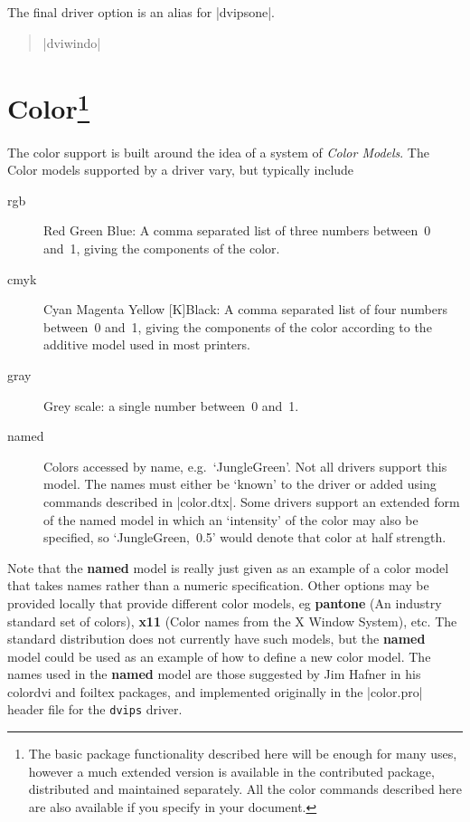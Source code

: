 The final driver option is an alias for |dvipsone|.
\begin{quote}\raggedright
  |dviwindo|
\end{quote}


\section[Color]{Color\footnote{%
The basic  package functionality described here
will be enough for many uses, however a much extended version
is available in the contributed  package, distributed
and maintained separately. All the color commands described here are
also available if you specify  in your document.}%
}
The color support is built around the idea of a system of
\emph{Color Models}. The Color models supported by a driver vary,
but typically include
\begin{description}
\item[rgb] Red Green Blue: A comma separated list of three numbers
  between~0 and~1, giving the components of the color.
\item[cmyk] Cyan Magenta Yellow [K]Black:  A comma separated list of
  four numbers between~0 and~1, giving the components of the color
  according to the additive model used in most printers.
\item[gray] Grey scale: a single number between~0 and~1.
\item[named] Colors accessed by name, e.g.\ `JungleGreen'. Not all
  drivers support this model. The names must either be `known' to the
  driver or added using commands described in |color.dtx|. Some drivers
  support an extended form of the named model in which an `intensity' of
  the color may also be specified, so `\mbox{JungleGreen, 0.5}' would
  denote that color at half strength.
\end{description}
Note that the \textbf{named} model is really just given as an example
of a color model that takes names rather than a numeric specification.
Other options may be provided locally that provide different color
models, eg \textbf{pantone} (An industry standard set of colors),
\textbf{x11} (Color names from the X Window System), etc. The
standard distribution does not currently have such models, but the
\textbf{named} model could be used as an example of how to define a new
color model. The names used in the \textbf{named} model are those
suggested by Jim Hafner in his \textsf{colordvi} and \textsf{foiltex}
packages, and implemented originally in the |color.pro| header file for
the \texttt{dvips} driver.

